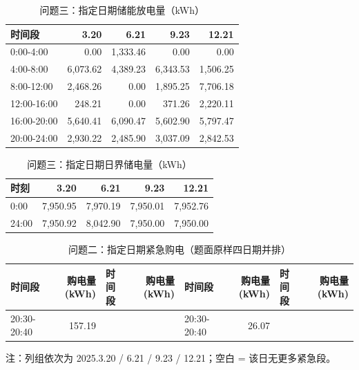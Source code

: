 \begin{table}[htbp]
\centering
\caption{问题三：指定日期储能放电量（kWh）}
\label{tab:q3-b2}
\small
\setlength{\tabcolsep}{4pt}
\begin{tabular}{lrrrr}
\toprule
时间段 & 3.20 & 6.21 & 9.23 & 12.21 \\
\midrule
0:00-4:00 & 0.00 & 1,333.46 & 0.00 & 0.00 \\
4:00-8:00 & 6,073.62 & 4,389.23 & 6,343.53 & 1,506.25 \\
8:00-12:00 & 2,468.26 & 0.00 & 1,895.25 & 7,706.18 \\
12:00-16:00 & 248.21 & 0.00 & 371.26 & 2,220.11 \\
16:00-20:00 & 5,640.41 & 6,090.47 & 5,602.90 & 5,797.47 \\
20:00-24:00 & 2,930.22 & 2,485.90 & 3,037.09 & 2,842.53 \\
\bottomrule
\end{tabular}
\end{table}
\begin{table}[htbp]
\centering
\caption{问题三：指定日期日界储电量（kWh）}
\label{tab:q3-b3}
\small
\setlength{\tabcolsep}{4pt}
\begin{tabular}{lrrrr}
\toprule
时刻 & 3.20 & 6.21 & 9.23 & 12.21 \\
\midrule
0:00 & 7,950.95 & 7,970.19 & 7,950.01 & 7,952.76 \\
24:00 & 7,950.92 & 8,042.90 & 7,950.00 & 7,950.00 \\
\bottomrule
\end{tabular}
\end{table}
\begin{table}[htbp]
\centering
\caption{问题二：指定日期紧急购电（题面原样四日期并排）}
\label{tab:q2-c2}
\small
\setlength{\tabcolsep}{4pt}
\begin{tabular}{lrlrlrlr}
\toprule
时间段 & 购电量 (kWh) & 时间段 & 购电量 (kWh) & 时间段 & 购电量 (kWh) & 时间段 & 购电量 (kWh) \\
\midrule
20:30-20:40 & 157.19 &  &  & 20:30-20:40 & 26.07 &  &  \\
\bottomrule
\end{tabular}
\vspace{2pt}
\begin{flushleft}\footnotesize 注：列组依次为 2025.3.20 / 6.21 / 9.23 / 12.21；空白 = 该日无更多紧急段。\end{flushleft}
\end{table}
